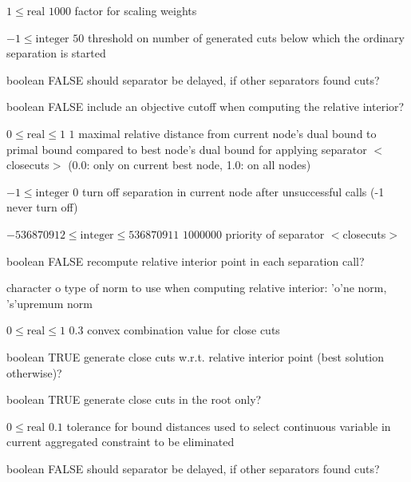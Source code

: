 %
{$1\leq\textrm{real}$}%
{$1000$}%
{factor for scaling weights}%
{}

%
{$-1\leq\textrm{integer}$}%
{$50$}%
{threshold on number of generated cuts below which the ordinary separation is started}%
{}

%
{boolean}%
{FALSE}%
{should separator be delayed, if other separators found cuts?}%
{}

%
{boolean}%
{FALSE}%
{include an objective cutoff when computing the relative interior?}%
{}

%
{$0\leq\textrm{real}\leq1$}%
{$1$}%
{maximal relative distance from current node's dual bound to primal bound compared to best node's dual bound for applying separator $<$closecuts$>$ (0.0: only on current best node, 1.0: on all nodes)}%
{}

%
{$-1\leq\textrm{integer}$}%
{$0$}%
{turn off separation in current node after unsuccessful calls (-1 never turn off)}%
{}

%
{$-536870912\leq\textrm{integer}\leq536870911$}%
{$1000000$}%
{priority of separator $<$closecuts$>$}%
{}

%
{boolean}%
{FALSE}%
{recompute relative interior point in each separation call?}%
{}

%
{character}%
{o}%
{type of norm to use when computing relative interior: 'o'ne norm, 's'upremum norm}%
{}

%
{$0\leq\textrm{real}\leq1$}%
{$0.3$}%
{convex combination value for close cuts}%
{}

%
{boolean}%
{TRUE}%
{generate close cuts w.r.t. relative interior point (best solution otherwise)?}%
{}

%
{boolean}%
{TRUE}%
{generate close cuts in the root only?}%
{}

%
{$0\leq\textrm{real}$}%
{$0.1$}%
{tolerance for bound distances used to select continuous variable in current aggregated constraint to be eliminated}%
{}

%
{boolean}%
{FALSE}%
{should separator be delayed, if other separators found cuts?}%
{}


